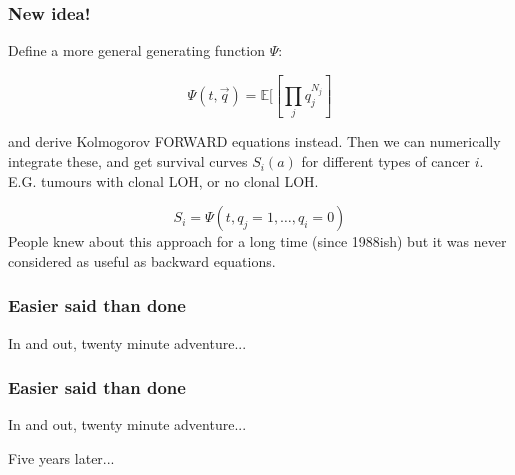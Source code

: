 \documentclass{beamer}
\begin{document}
\begin{frame}
    \frametitle{New idea!}
    Define a more general generating function $\Psi$:

    \begin{equation}
        \Psi(t, \vec{q}) = \mathbb{E}[\left[\prod_j q_j^{N_j}\right]
    \end{equation}

    and derive Kolmogorov FORWARD equations instead. Then we can numerically
    integrate these, and get survival curves $S_i(a)$ for different types of
    cancer $i$. E.G. tumours with clonal LOH, or no clonal LOH.

    \begin{equation}
        S_i = \Psi(t, q_j =1, \dots, q_i = 0)
    \end{equation}
    People knew about this approach for a long time (since 1988ish) but it was never
    considered as useful as backward equations.

\end{frame}

\begin{frame}
    \frametitle{Easier said than done}

    In and out, twenty minute adventure...

    \;

    \vphantom{Five years later...}
\end{frame}

\begin{frame}
    \frametitle{Easier said than done}

    In and out, twenty minute adventure...

    \;

    {Five years later...}
\end{frame}
\end{document}
